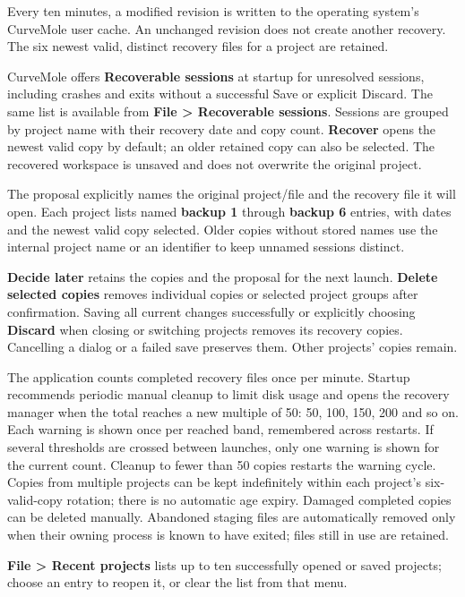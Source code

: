 \documentclass[
  10pt,
  a4paper,
  oneside]{scrreprt}
\begin{document}
Every ten minutes, a modified revision is written to the operating
system's CurveMole user cache. An unchanged revision does not create
another recovery. The six newest valid, distinct recovery files for a
project are retained.

CurveMole offers \textbf{Recoverable sessions} at startup for unresolved
sessions, including crashes and exits without a successful Save or
explicit Discard. The same list is available from \textbf{File
\textgreater{} Recoverable sessions}. Sessions are grouped by project
name with their recovery date and copy count. \textbf{Recover} opens the
newest valid copy by default; an older retained copy can also be
selected. The recovered workspace is unsaved and does not overwrite the
original project.

The proposal explicitly names the original project/file and the recovery
file it will open. Each project lists named \textbf{backup 1} through
\textbf{backup 6} entries, with dates and the newest valid copy
selected. Older copies without stored names use the internal project
name or an identifier to keep unnamed sessions distinct.

\textbf{Decide later} retains the copies and the proposal for the next
launch. \textbf{Delete selected copies} removes individual copies or
selected project groups after confirmation. Saving all current changes
successfully or explicitly choosing \textbf{Discard} when closing or
switching projects removes its recovery copies. Cancelling a dialog or a
failed save preserves them. Other projects' copies remain.

The application counts completed recovery files once per minute. Startup
recommends periodic manual cleanup to limit disk usage and opens the
recovery manager when the total reaches a new multiple of 50: 50, 100,
150, 200 and so on. Each warning is shown once per reached band,
remembered across restarts. If several thresholds are crossed between
launches, only one warning is shown for the current count. Cleanup to
fewer than 50 copies restarts the warning cycle. Copies from multiple
projects can be kept indefinitely within each project's six-valid-copy
rotation; there is no automatic age expiry. Damaged completed copies can
be deleted manually. Abandoned staging files are automatically removed
only when their owning process is known to have exited; files still in
use are retained.

\textbf{File \textgreater{} Recent projects} lists up to ten
successfully opened or saved projects; choose an entry to reopen it, or
clear the list from that menu.
\end{document}
